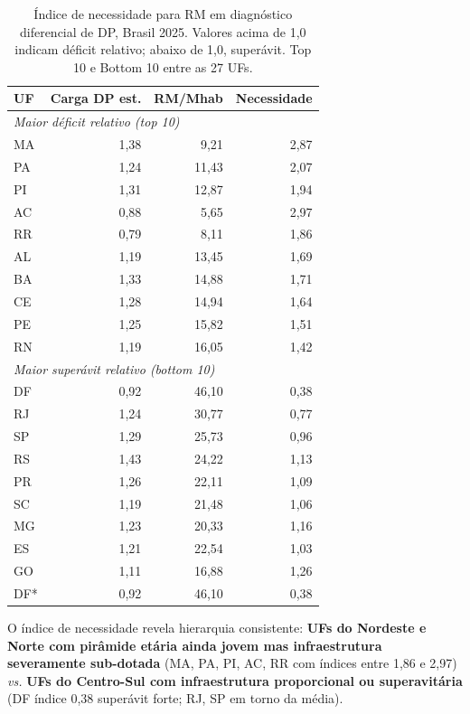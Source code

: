 \documentclass[12pt,a4paper,oneside]{article}
\begin{document}
\begin{table}[htbp]
\centering
\caption{Índice de necessidade para RM em diagnóstico diferencial
de DP, Brasil 2025. Valores acima de 1,0 indicam déficit relativo;
abaixo de 1,0, superávit. Top 10 e Bottom 10 entre as 27 UFs.}
\label{tab:necessidade-rm}
\small
\begin{tabular}{l r r r}
\toprule
\textbf{UF} & \textbf{Carga DP est.} & \textbf{RM/Mhab} &
\textbf{Necessidade} \\
\midrule
\multicolumn{4}{l}{\textit{Maior déficit relativo (top 10)}} \\
\midrule
MA &  1{,}38 &  9{,}21 & 2{,}87 \\
PA &  1{,}24 & 11{,}43 & 2{,}07 \\
PI &  1{,}31 & 12{,}87 & 1{,}94 \\
AC &  0{,}88 &  5{,}65 & 2{,}97 \\
RR &  0{,}79 &  8{,}11 & 1{,}86 \\
AL &  1{,}19 & 13{,}45 & 1{,}69 \\
BA &  1{,}33 & 14{,}88 & 1{,}71 \\
CE &  1{,}28 & 14{,}94 & 1{,}64 \\
PE &  1{,}25 & 15{,}82 & 1{,}51 \\
RN &  1{,}19 & 16{,}05 & 1{,}42 \\
\midrule
\multicolumn{4}{l}{\textit{Maior superávit relativo (bottom 10)}} \\
\midrule
DF &  0{,}92 & 46{,}10 & 0{,}38 \\
RJ &  1{,}24 & 30{,}77 & 0{,}77 \\
SP &  1{,}29 & 25{,}73 & 0{,}96 \\
RS &  1{,}43 & 24{,}22 & 1{,}13 \\
PR &  1{,}26 & 22{,}11 & 1{,}09 \\
SC &  1{,}19 & 21{,}48 & 1{,}06 \\
MG &  1{,}23 & 20{,}33 & 1{,}16 \\
ES &  1{,}21 & 22{,}54 & 1{,}03 \\
GO &  1{,}11 & 16{,}88 & 1{,}26 \\
DF*&  0{,}92 & 46{,}10 & 0{,}38 \\
\bottomrule
\end{tabular}
\end{table}

O índice de necessidade revela hierarquia consistente:
\textbf{UFs do Nordeste e Norte com pirâmide etária ainda jovem
mas infraestrutura severamente sub-dotada} (MA, PA, PI, AC, RR
com índices entre 1,86 e 2,97) \textit{vs.} \textbf{UFs do
Centro-Sul com infraestrutura proporcional ou superavitária}
(DF índice 0,38 \textemdash{} superávit forte; RJ, SP em torno
da média).
\end{document}
